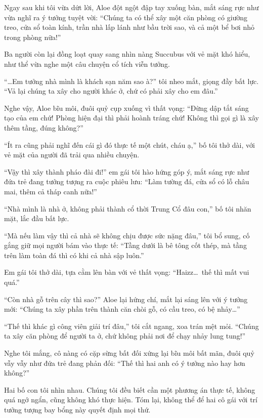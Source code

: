 \documentclass[../main.tex]{subfiles}
\begin{document}
Ngay sau khi tôi vừa dứt lời, Aloe đột ngột đập tay xuống bàn, mắt sáng rực như vừa nghĩ ra ý tưởng tuyệt vời: ``Chúng ta có thể xây một căn phòng có giường treo, cửa sổ toàn kính, trần nhà lấp lánh như bầu trời sao, và cả một bể bơi nhỏ trong phòng nữa!''

Ba người còn lại đồng loạt quay sang nhìn nàng Succubus với vẻ mặt khó hiểu, như thể vừa nghe một câu chuyện cổ tích viễn tưởng.

``\dots Em tưởng nhà mình là khách sạn năm sao à?'' tôi nheo mắt, giọng đầy bất lực. ``Vả lại chúng ta xây cho người khác ở, chứ có phải xây cho em đâu.''

Nghe vậy, Aloe bĩu môi, đuôi quỷ cụp xuống vì thất vọng: ``Đừng dập tắt sáng tạo của em chứ! Phòng hiện đại thì phải hoành tráng chứ! Không thì gọi gì là xây thêm tầng, đúng không?''

``Ít ra cũng phải nghĩ đến cái gì đó thực tế một chút, cháu ạ,'' bố tôi thở dài, với vẻ mặt của người đã trải qua nhiều chuyện.

``Vậy thì xây thành pháo đài đi!'' em gái tôi hào hứng góp ý, mắt sáng rực như đứa trẻ đang tưởng tượng ra cuộc phiêu lưu: ``Làm tường đá, cửa sổ có lỗ châu mai, thêm cả tháp canh nữa!''

``Nhà mình là nhà ở, không phải thành cổ thời Trung Cổ đâu con,'' bố tôi nhăn mặt, lắc đầu bất lực.

``Mà nếu làm vậy thì cả nhà sẽ không chịu được sức nặng đâu,'' tôi bổ sung, cố gắng giữ mọi người bám vào thực tế: ``Tầng dưới là bê tông cốt thép, mà tầng trên làm toàn đá thì có khi cả nhà sập luôn.''

Em gái tôi thở dài, tựa cằm lên bàn với vẻ thất vọng: ``Haizz\dots\ thế thì mất vui quá.''

``Còn nhà gỗ trên cây thì sao?'' Aloe lại hứng chí, mắt lại sáng lên với ý tưởng mới: ``Chúng ta xây phần trên thành căn chòi gỗ, có cầu treo, có bệ nhảy\dots''

``Thế thì khác gì công viên giải trí đâu,'' tôi cắt ngang, xoa trán mệt mỏi. ``Chúng ta xây căn phòng để người ta ở, chứ không phải nơi để chạy nhảy lung tung!''

Nghe tôi mắng, cô nàng có cặp sừng bất đối xứng lại bĩu môi bất mãn, đuôi quỷ vẫy vẫy như đứa trẻ đang phản đối: ``Thế thì hai anh có ý tưởng nào hay hơn không?''

Hai bố con tôi nhìn nhau. Chúng tôi đều biết cần một phương án thực tế, không quá ngớ ngẩn, cũng không khó thực hiện. Tóm lại, không thể để hai cô gái với trí tưởng tượng bay bổng này quyết định mọi thứ.
\end{document}
